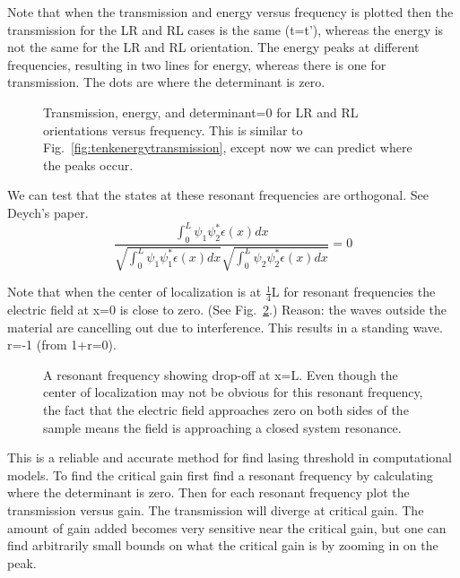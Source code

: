 Note that when the transmission and energy versus frequency is plotted then the transmission for the LR and RL cases is the same (t=t'), whereas the energy is not the same for the LR and RL orientation. The energy peaks at different frequencies, resulting in two lines for energy, whereas there is one for transmission.  The dots are where the determinant is zero.

\begin{figure}
\vskip -0.5cm
\centerline{
} 
\vskip -0.5cm
\caption[Transmission, energy, and determinant=0 for LR and RL orientations versus frequency.]{Transmission, energy, and determinant=0 for LR and RL orientations versus frequency. This is similar to Fig.~\ref{fig:tenkenergytransmission}, except now we can predict where the peaks occur.}
\label{fig:energytransmissiondet}
\end{figure}
We can test that the states at these resonant frequencies are orthogonal. See Deych's paper\cite{2005_Deych}.
\begin{equation}
\frac{\int _0 ^L \psi _1 \psi _2 ^* \epsilon(x) dx}
{\sqrt{\int _0 ^L \psi _1 \psi _1 ^* \epsilon(x) dx}
 \sqrt{\int _0 ^L \psi _2 \psi _2 ^* \epsilon(x) dx}} = 0
\end{equation}

Note that when the center of localization is at $ \frac{1}{4} $L for resonant frequencies the electric field at x=0 is close to zero.  (See Fig.~\ref{fig:standingwave}.) Reason: the waves outside the material are cancelling out due to interference.  This results in a standing wave.   r=-1 (from 1+r=0).

\begin{figure}
\vskip -0.5cm
\centerline{
}
\vskip -0.5cm
\caption[A resonant frequency showing drop-off at x=L.]{A resonant frequency showing drop-off at x=L. Even though the center of localization may not be obvious for this resonant frequency, the fact that the electric field approaches zero on both sides of the sample means the field is approaching a closed system resonance.}
\label{fig:standingwave}
\end{figure}

This is a reliable and accurate method for find lasing threshold in computational models. To find the critical gain first find a resonant frequency by calculating where the determinant is zero. Then for each resonant frequency plot the transmission versus gain. The transmission will diverge at critical gain. The amount of gain added becomes very sensitive near the critical gain, but one can find arbitrarily small bounds on what the critical gain is by zooming in on the peak.

